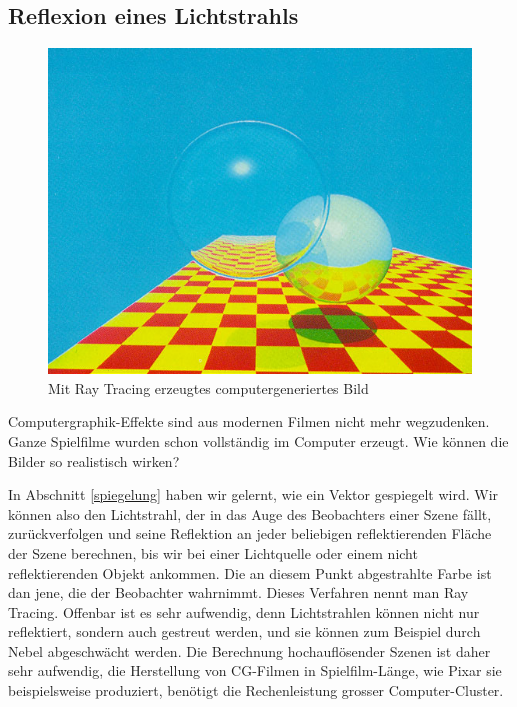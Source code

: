 \subsection{Reflexion eines Lichtstrahls}
\begin{figure}
\begin{center}
\includegraphics[width=1\hsize]{graphics/raytracing}
\end{center}
\caption{Mit Ray Tracing erzeugtes computergeneriertes Bild\label{raytracing}}
\end{figure}
Computergraphik-Effekte sind aus modernen Filmen nicht mehr wegzudenken.
Ganze Spielfilme wurden schon vollständig im Computer erzeugt.
Wie können die Bilder so realistisch wirken?

In Abschnitt \ref{spiegelung} haben wir gelernt, wie ein Vektor
gespiegelt wird.
Wir können also den Lichtstrahl, der in das Auge
des Beobachters einer Szene fällt, zurückverfolgen und seine Reflektion
an jeder beliebigen reflektierenden Fläche der Szene berechnen, bis wir bei
einer Lichtquelle oder einem nicht reflektierenden Objekt ankommen.
Die an diesem Punkt abgestrahlte Farbe ist dan jene, die der Beobachter
wahrnimmt.
Dieses Verfahren nennt man Ray Tracing.
Offenbar ist es sehr
aufwendig, denn Lichtstrahlen können nicht nur reflektiert, sondern auch
gestreut werden, und sie können zum Beispiel durch Nebel abgeschwächt
werden.
Die Berechnung hochauflösender Szenen ist daher sehr aufwendig,
die Herstellung von CG-Filmen in Spielfilm-Länge, wie Pixar sie beispielsweise
produziert, benötigt die Rechenleistung grosser Computer-Cluster.

